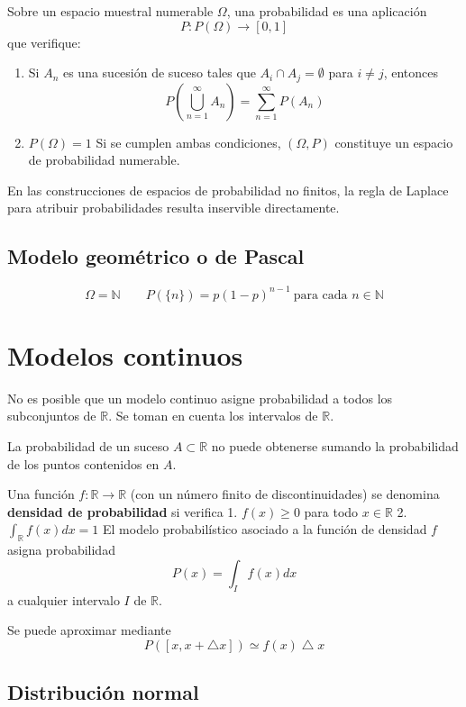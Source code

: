 \documentclass[12pt,a4paper,twoside]{memoir}
\theoremstyle{mystyle}
\begin{document}
Sobre un espacio muestral numerable \(\Omega\), una probabilidad es una aplicación \[P:P(\Omega) \rightarrow [0,1]\] que verifique:
\begin{enumerate}
  \item Si \(A_n\) es una sucesión de suceso tales que \(A_i \cap A_j = \emptyset\) para \(i \neq j\), entonces
  \[
  P\left(\bigcup_{n=1}^\infty A_n\right) = \sum_{n=1}^\infty P(A_n)
  \]
  \item \(P(\Omega) = 1\) Si se cumplen ambas condiciones, \((\Omega,P)\) constituye un espacio de probabilidad numerable.
\end{enumerate}


En las construcciones de espacios de probabilidad no finitos, la regla de Laplace para atribuir probabilidades resulta inservible directamente.

\subsection{Modelo geométrico o de Pascal}
\label{modelo-geomuxe9trico-o-de-pascal}

\[
\Omega = \mathbb{N} \qquad P(\{n\}) = p (1-p)^{n-1}\ \text{para cada }n \in \mathbb{N}
\]

\section{Modelos continuos} 

No es posible que un modelo continuo asigne probabilidad a todos los subconjuntos de \(\mathbb{R}\). Se toman en cuenta los intervalos de \(\mathbb{R}\).

La probabilidad de un suceso \(A \subset \mathbb{R}\) no puede obtenerse sumando la probabilidad de los puntos contenidos en \(A\).

Una función \(f: \mathbb{R} \rightarrow \mathbb{R}\) (con un número finito de discontinuidades) se denomina \textbf{densidad de   probabilidad} si verifica 1. \(f(x) \geq 0\) para todo
\(x \in \mathbb{R}\) 2. \(\int_\mathbb{R} f(x)dx = 1\) El modelo probabilístico asociado a la función de densidad \(f\) asigna probabilidad \[P(x) = \int_I f(x)dx\] a cualquier intervalo \(I\) de
\(\mathbb{R}\).

Se puede aproximar mediante 
\[
P([x, x + \bigtriangleup x]) \simeq f(x)\bigtriangleup x
\] 

\subsection{Distribución normal}
\end{document}
